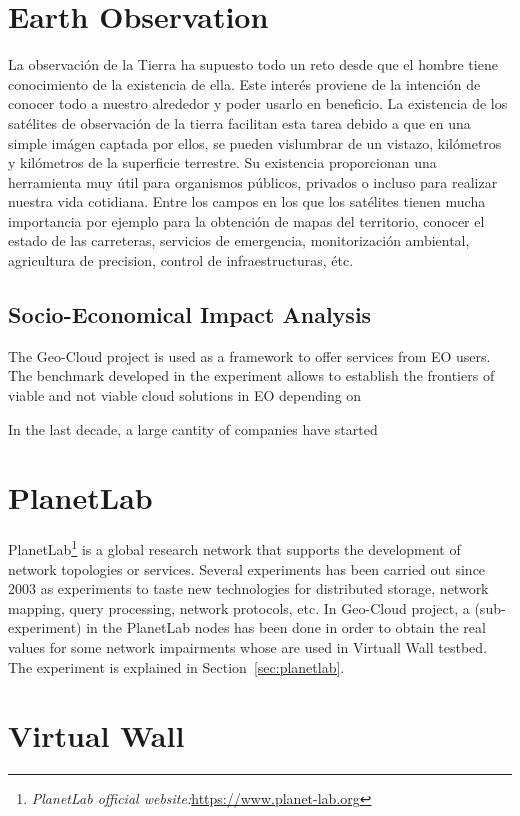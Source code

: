 \section{Earth Observation}

La observación de la Tierra ha supuesto todo un reto desde que el hombre tiene
conocimiento de la existencia de ella. Este interés proviene de la intención de
conocer todo a nuestro alrededor y poder usarlo en beneficio. 
La existencia de los satélites de observación
de la tierra facilitan esta tarea debido a que en una simple imágen captada por
ellos, se pueden vislumbrar de un vistazo, kilómetros y kilómetros de la
superficie terrestre. Su existencia proporcionan una herramienta muy útil para
organismos públicos, privados o incluso para realizar nuestra vida
cotidiana. Entre los campos en los que los satélites tienen mucha importancia
por ejemplo para la obtención de mapas del territorio, conocer el estado de las
carreteras, servicios de emergencia, monitorización ambiental, agricultura de
precision, control de infraestructuras, étc. 

\subsection{Socio-Economical Impact Analysis}

The Geo-Cloud project is used as a framework to offer services from EO
users. The benchmark developed in the experiment allows to establish the
frontiers of viable and not viable cloud solutions in EO depending on  

In the last decade, a large cantity of companies have started 
\section{PlanetLab}

PlanetLab\footnote{\emph{PlanetLab official website:}\url{https://www.planet-lab.org}} is
a global research network that supports the development of network topologies or
services. Several experiments has been carried out since 2003 as experiments to
taste new technologies for distributed storage, network mapping, query
processing, network protocols, etc.
In Geo-Cloud project, a (sub-experiment) in the PlanetLab nodes has been
done in order to obtain the real values for some network impairments whose are
used in Virtuall Wall testbed. The experiment is explained in Section~\ref{sec:planetlab}.

\section{Virtual Wall}

